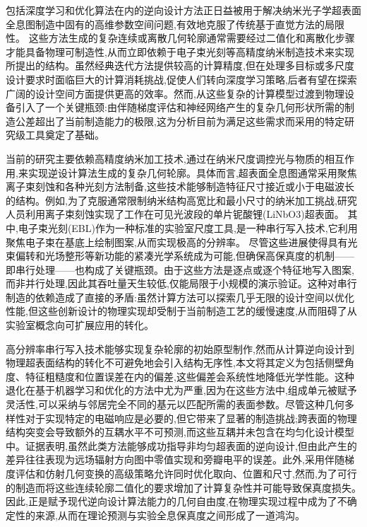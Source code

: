 包括深度学习和优化算法在内的逆向设计方法正日益被用于解决纳米光子学超表面全息图制造中固有的高维参数空间问题,有效地克服了传统基于直觉方法的局限性。\citep{doi_10_1109_metamaterials54993_2022_9920895_1a67346a} 这些方法生成的复杂连续或离散几何轮廓通常需要经过二值化和离散化步骤才能具备物理可制造性,从而立即依赖于电子束光刻等高精度纳米制造技术来实现所提出的结构。虽然经典迭代方法提供较高的计算精度,但在处理多目标或多尺度设计要求时面临巨大的计算消耗挑战,促使人们转向深度学习策略,后者有望在探索广阔的设计空间方面提供更高的效率。然而,从这些复杂的计算模型过渡到物理设备引入了一个关键瓶颈:由伴随梯度评估和神经网络产生的复杂几何形状所需的制造公差超出了当前制造能力的极限,这为分析目前为满足这些需求而采用的特定研究级工具奠定了基础。\citep{doi_10_1088_1361_6439_ad3a72_72d60f33} \citep{doi_10_48550_arxiv_2603_15210_fdcfb92f} \citep{doi_10_1109_metamaterials54993_2022_9920895_1a67346a}

当前的研究主要依赖高精度纳米加工技术,通过在纳米尺度调控光与物质的相互作用,来实现逆设计算法生成的复杂几何轮廓。具体而言,超表面全息图通常采用聚焦离子束刻蚀和各种光刻方法制备,这些技术能够制造特征尺寸接近或小于电磁波长的结构。例如,为了克服通常限制纳米结构高宽比和最小尺寸的纳米加工挑战,研究人员利用离子束刻蚀实现了工作在可见光波段的单片铌酸锂(LiNbO3)超表面。\citep{doi_10_1021_acsphotonics_1c00026_bdd15a92} 其中,电子束光刻(EBL)作为一种标准的实验室尺度工具,是一种串行写入技术,它利用聚焦电子束在基底上绘制图案,从而实现极高的分辨率。\citep{doi_10_1088_1361_6528_ad3c4c_ac8a5241} \citep{doi_10_1021_acsomega_4c01044_0ad8ee05} 尽管这些进展使得具有光束偏转和光场整形等新功能的紧凑光学系统成为可能,但确保高保真度的机制------即串行处理------也构成了关键瓶颈。由于这些方法是逐点或逐个特征地写入图案,而非并行处理,因此其吞吐量天生较低,仅能局限于小规模的演示验证。这种对串行制造的依赖造成了直接的矛盾:虽然计算方法可以探索几乎无限的设计空间以优化性能,但这些创新设计的物理实现却受制于当前制造工艺的缓慢速度,从而阻碍了从实验室概念向可扩展应用的转化。\citep{doi_10_1021_acsphotonics_3c00572_fda8f742} \citep{doi_10_1002_inf2_12116_b5c46838}

高分辨率串行写入技术能够实现复杂轮廓的初始原型制作,然而从计算逆向设计到物理超表面结构的转化不可避免地会引入结构无序性,本文将其定义为包括侧壁角度、特征粗糙度和位置误差在内的偏差,这些偏差会系统性地降低光学性能。这种退化在基于机器学习和优化的方法中尤为严重,因为在这些方法中,组成单元被赋予灵活性,可以采纳与邻居完全不同的基元以匹配所需的表面参数。尽管这种几何多样性对于实现特定的电磁响应是必要的,但它带来了显著的制造挑战;跨表面的物理结构突变会导致额外的互耦水平不可预测,而这些互耦并未包含在均匀化设计模型中。证据表明,虽然此类方法能够成功指导非均匀超表面的逆向设计,但由此产生的差异往往表现为远场辐射方向图中零值实现和旁瓣电平的误差。此外,采用伴随梯度评估和仿射几何变换的高级策略允许同时优化取向、位置和尺寸,然而,为了可行的制造而将这些连续轮廓二值化的要求增加了计算复杂性并可能导致保真度损失。因此,正是赋予现代逆向设计算法能力的几何自由度,在物理实现过程中成为了不确定性的来源,从而在理论预测与实验全息保真度之间形成了一道鸿沟。\citep{doi_10_48550_arxiv_2603_15210_fdcfb92f} \citep{doi_10_1109_tap_2021_3137496_d4a1d597}

